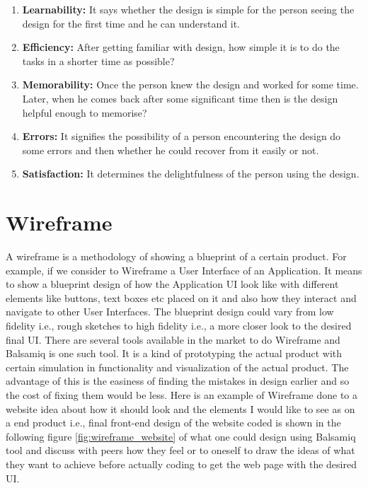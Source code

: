 \begin{enumerate}
\item \textbf{Learnability:}  It says whether the design is simple for the person seeing the design for the first time and he can understand it.
\item \textbf{Efficiency:}  After getting familiar with design, how simple it is to do the tasks in a shorter time as possible?
\item \textbf{Memorability:} Once the person knew the design and worked for some time. Later, when he comes back after some significant time then is the design helpful enough to memorise?
\item \textbf{Errors:} It signifies the possibility of a person encountering the design do some errors and then whether he could recover from it easily or not.
\item \textbf{Satisfaction:} It determines the delightfulness of the person using the design.
\end{enumerate}

\section{Wireframe}

A wireframe is a methodology of showing a blueprint of a certain product. For example, if we consider to Wireframe a User Interface of an Application. It means to show a blueprint design of how the Application UI look like with different elements like buttons, text boxes etc placed on it and also how they interact and navigate to other User Interfaces. The blueprint design could vary from low fidelity i.e., rough sketches to high fidelity i.e., a more closer look to the desired final UI. There are several tools available in the market to do Wireframe and Balsamiq \cite{B} is one such tool. It is a kind of prototyping the actual product with certain simulation in functionality and visualization of the actual product. The advantage of this is the easiness of finding the mistakes in design earlier and so the cost of fixing them would be less. Here is an example of Wireframe done to a website idea about how it should look and the elements I would like to see as on a end product i.e., final front-end  design of the website coded is shown in the following figure \ref{fig:wireframe_website} of what one could design using Balsamiq tool and discuss with peers how they feel or to oneself to draw the ideas of what they want to achieve before actually coding to get the web page with the desired UI. \\ \\

